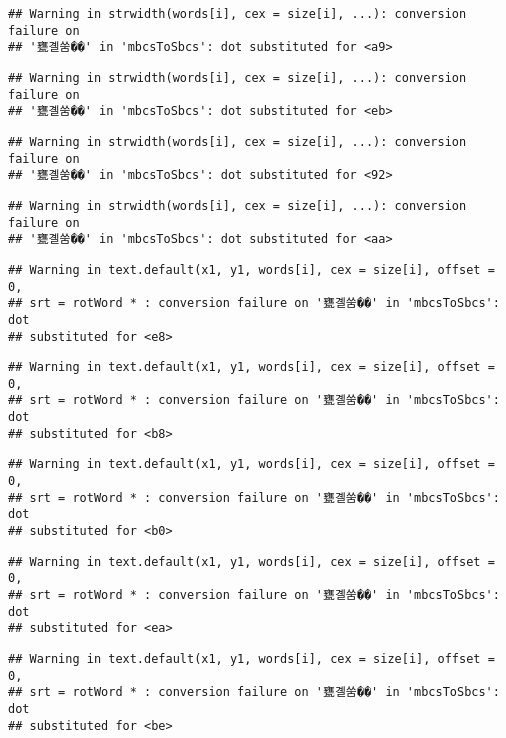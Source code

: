 \documentclass[]{article}
\begin{document}
\begin{verbatim}
## Warning in strwidth(words[i], cex = size[i], ...): conversion failure on
## '甕곌쑴��' in 'mbcsToSbcs': dot substituted for <a9>
\end{verbatim}

\begin{verbatim}
## Warning in strwidth(words[i], cex = size[i], ...): conversion failure on
## '甕곌쑴��' in 'mbcsToSbcs': dot substituted for <eb>
\end{verbatim}

\begin{verbatim}
## Warning in strwidth(words[i], cex = size[i], ...): conversion failure on
## '甕곌쑴��' in 'mbcsToSbcs': dot substituted for <92>
\end{verbatim}

\begin{verbatim}
## Warning in strwidth(words[i], cex = size[i], ...): conversion failure on
## '甕곌쑴��' in 'mbcsToSbcs': dot substituted for <aa>
\end{verbatim}

\begin{verbatim}
## Warning in text.default(x1, y1, words[i], cex = size[i], offset = 0,
## srt = rotWord * : conversion failure on '甕곌쑴��' in 'mbcsToSbcs': dot
## substituted for <e8>
\end{verbatim}

\begin{verbatim}
## Warning in text.default(x1, y1, words[i], cex = size[i], offset = 0,
## srt = rotWord * : conversion failure on '甕곌쑴��' in 'mbcsToSbcs': dot
## substituted for <b8>
\end{verbatim}

\begin{verbatim}
## Warning in text.default(x1, y1, words[i], cex = size[i], offset = 0,
## srt = rotWord * : conversion failure on '甕곌쑴��' in 'mbcsToSbcs': dot
## substituted for <b0>
\end{verbatim}

\begin{verbatim}
## Warning in text.default(x1, y1, words[i], cex = size[i], offset = 0,
## srt = rotWord * : conversion failure on '甕곌쑴��' in 'mbcsToSbcs': dot
## substituted for <ea>
\end{verbatim}

\begin{verbatim}
## Warning in text.default(x1, y1, words[i], cex = size[i], offset = 0,
## srt = rotWord * : conversion failure on '甕곌쑴��' in 'mbcsToSbcs': dot
## substituted for <be>
\end{verbatim}
\end{document}
